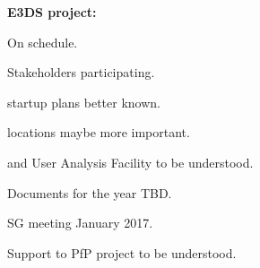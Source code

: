 \begin{frame}[fragile,t]
\vspace{\mytopbit}
{\bf E3DS project:}
\bitm
  \item {On schedule.}
  \item {Stakeholders participating.}
  \item {\ED startup plans better known.}
  \item {\DC locations maybe more important.}
  \item {\OC and User Analysis Facility to be understood.}
  \item {Documents for the \third year TBD.}
  \item {SG meeting January 2017.}
  \item {Support to \ED PfP project to be understood.}
\eitm

\end{frame}
